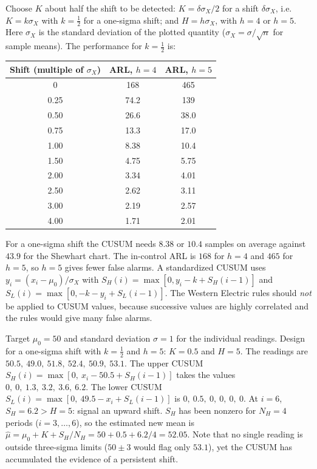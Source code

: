 \begin{theorem}\label{thm:cusumdesign}
Choose $K$ about half the shift to be detected: $K=\delta\sigma_X/2$ for a shift $\delta\sigma_X$, i.e.\ $K=k\sigma_X$ with $k=\tfrac12$ for a one-sigma shift; and $H=h\sigma_X$, with $h=4$ or $h=5$. Here $\sigma_X$ is the standard deviation of the plotted quantity ($\sigma_X=\sigma/\sqrt n$ for sample means). The performance for $k=\tfrac12$ is:
\begin{center}
\begin{tabular}{c|cc}
\toprule
Shift (multiple of $\sigma_X$) & ARL, $h=4$ & ARL, $h=5$\\
\midrule
0 & 168 & 465\\
0.25 & 74.2 & 139\\
0.50 & 26.6 & 38.0\\
0.75 & 13.3 & 17.0\\
1.00 & 8.38 & 10.4\\
1.50 & 4.75 & 5.75\\
2.00 & 3.34 & 4.01\\
2.50 & 2.62 & 3.11\\
3.00 & 2.19 & 2.57\\
4.00 & 1.71 & 2.01\\
\bottomrule
\end{tabular}
\end{center}
\end{theorem}

For a one-sigma shift the CUSUM needs $8.38$ or $10.4$ samples on average against $43.9$ for the Shewhart chart. The in-control ARL is $168$ for $h=4$ and $465$ for $h=5$, so $h=5$ gives fewer false alarms. A standardized CUSUM uses $y_i=(x_i-\mu_0)/\sigma_X$ with $S_H(i)=\max[0,y_i-k+S_H(i-1)]$ and $S_L(i)=\max[0,-k-y_i+S_L(i-1)]$. The Western Electric rules should \emph{not} be applied to CUSUM values, because successive values are highly correlated and the rules would give many false alarms.

\begin{example}\label{ex:cusum}
Target $\mu_0=50$ and standard deviation $\sigma=1$ for the individual readings. Design for a one-sigma shift with $k=\tfrac12$ and $h=5$: $K=0.5$ and $H=5$. The readings are $50.5,\ 49.0,\ 51.8,\ 52.4,\ 50.9,\ 53.1$. The upper CUSUM $S_H(i)=\max[0,\ x_i-50.5+S_H(i-1)]$ takes the values $0,\ 0,\ 1.3,\ 3.2,\ 3.6,\ 6.2$. The lower CUSUM $S_L(i)=\max[0,\ 49.5-x_i+S_L(i-1)]$ is $0,\ 0.5,\ 0,\ 0,\ 0,\ 0$. At $i=6$, $S_H=6.2>H=5$: signal an upward shift. $S_H$ has been nonzero for $N_H=4$ periods ($i=3,\dots,6$), so the estimated new mean is $\hat\mu=\mu_0+K+S_H/N_H=50+0.5+6.2/4=52.05$. Note that no single reading is outside three-sigma limits ($50\pm3$ would flag only $53.1$), yet the CUSUM has accumulated the evidence of a persistent shift.
\end{example}


